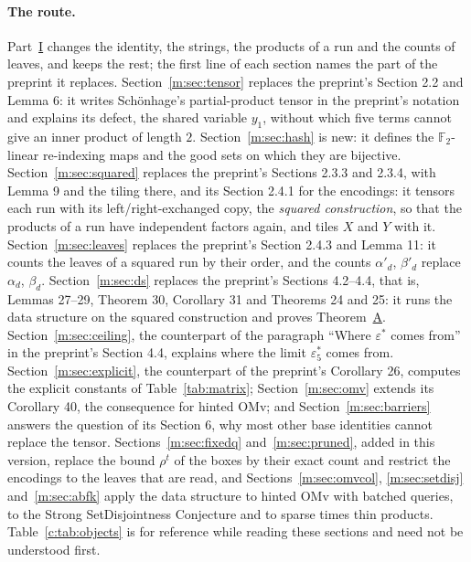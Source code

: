 \documentclass[11pt]{article}
\theoremstyle{definition}
\theoremstyle{remark}
\newcommand{\F}{\mathbb{F}_2}
\newcommand{\es}{\varepsilon^*_5}
\begin{document}
\paragraph{The route.} Part~\hyperref[m:partI]{I} changes the identity, the strings, the products of a run and the counts of leaves, and keeps the rest; the first line of each section names the part of the preprint it replaces. Section~\ref{m:sec:tensor} replaces the preprint's Section 2.2 and Lemma 6: it writes Schönhage's partial-product tensor in the preprint's notation and explains its defect, the shared variable $y_1$, without which five terms cannot give an inner product of length $2$. Section~\ref{m:sec:hash} is new: it defines the $\F$-linear re-indexing maps and the good sets on which they are bijective. Section~\ref{m:sec:squared} replaces the preprint's Sections 2.3.3 and 2.3.4, with Lemma 9 and the tiling there, and its Section 2.4.1 for the encodings: it tensors each run with its left/right-exchanged copy, the \emph{squared construction}, so that the products of a run have independent factors again, and tiles $X$ and $Y$ with it. Section~\ref{m:sec:leaves} replaces the preprint's Section 2.4.3 and Lemma 11: it counts the leaves of a squared run by their order, and the counts $\alpha'_d$, $\beta'_d$ replace $\alpha_d$, $\beta_d$. Section~\ref{m:sec:ds} replaces the preprint's Sections 4.2--4.4, that is, Lemmas 27--29, Theorem 30, Corollary 31 and Theorems 24 and 25: it runs the data structure on the squared construction and proves Theorem~\hyperref[m:introA]{A}. Section~\ref{m:sec:ceiling}, the counterpart of the paragraph ``Where $\varepsilon^*$ comes from'' in the preprint's Section 4.4, explains where the limit $\es$ comes from. Section~\ref{m:sec:explicit}, the counterpart of the preprint's Corollary 26, computes the explicit constants of Table~\ref{tab:matrix}; Section~\ref{m:sec:omv} extends its Corollary 40, the consequence for hinted OMv; and Section~\ref{m:sec:barriers} answers the question of its Section 6, why most other base identities cannot replace the tensor. Sections~\ref{m:sec:fixedq} and~\ref{m:sec:pruned}, added in this version, replace the bound $\rho^t$ of the boxes by their exact count and restrict the encodings to the leaves that are read, and Sections~\ref{m:sec:omvcol}, \ref{m:sec:setdisj} and~\ref{m:sec:abfk} apply the data structure to hinted OMv with batched queries, to the Strong SetDisjointness Conjecture and to sparse times thin products. Table~\ref{c:tab:objects} is for reference while reading these sections and need not be understood first.
\end{document}
